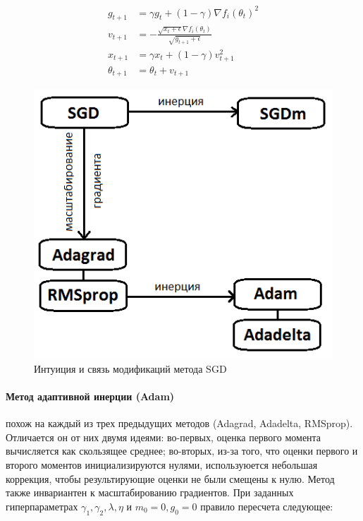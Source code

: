 \documentclass[12pt]{article}
\begin{document}

\begin{equation}
\begin{aligned}
g_{t+1} &= \gamma g_t + (1 - \gamma) \nabla f_i(\theta_t)^2\\
v_{t+1} &= - \frac{\sqrt{x_t + \epsilon} \nabla f_i(\theta_t)}{\sqrt{g_{t+1} + \epsilon}}\\
x_{t+1} &= \gamma x_t + (1 - \gamma) v_{t+1}^2\\
\theta_{t+1} &= \theta_t + v_{t+1}
\end{aligned}
\end{equation}

\begin{figure}[h!]
\centering
\includegraphics[scale=0.6]{methods.png}
\caption{Интуиция и связь модификаций метода SGD} \label{intuition}
\end{figure}

\newpage
\paragraph{Метод адаптивной инерции (Adam) \cite{adam}} похож на каждый из трех предыдущих методов (Adagrad, Adadelta, RMSprop). Отличается он от них двумя идеями: во-первых, оценка первого момента вычисляется как скользящее среднее; во-вторых, из-за того, что оценки первого и второго моментов инициализируются нулями, используюется небольшая коррекция, чтобы результирующие оценки не были смещены к нулю. Метод также инвариантен к масштабированию градиентов. При заданных гиперпараметрах $\gamma_1, \gamma_2, \lambda, \eta$ и $m_0 = 0, g_0 = 0$ правило пересчета следующее: \cite{adam}
\end{document}
